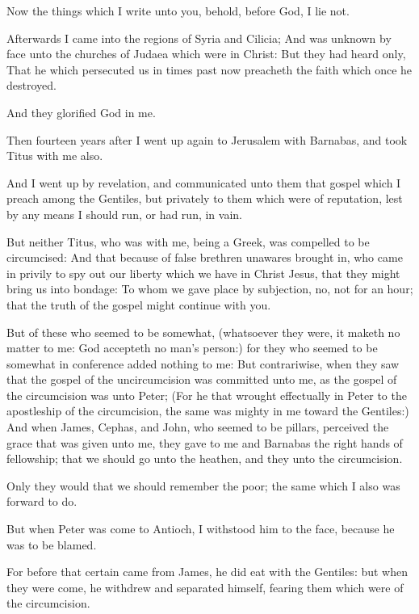 \Verse Now the things which I write unto you, behold, before God, I lie not.

\Verse Afterwards I came into the regions of Syria and Cilicia; \Verse And was unknown by face unto the churches of Judaea which were in Christ: \Verse But they had heard only, That he which persecuted us in times past now preacheth the faith which once he destroyed.

\Verse And they glorified God in me.


\Chapter
\Verse Then fourteen years after I went up again to Jerusalem with Barnabas, and took Titus with me also.

\Verse And I went up by revelation, and communicated unto them that gospel which I preach among the Gentiles, but privately to them which were of reputation, lest by any means I should run, or had run, in vain.

\Verse But neither Titus, who was with me, being a Greek, was compelled to be circumcised: \Verse And that because of false brethren unawares brought in, who came in privily to spy out our liberty which we have in Christ Jesus, that they might bring us into bondage: \Verse To whom we gave place by subjection, no, not for an hour; that the truth of the gospel might continue with you.

\Verse But of these who seemed to be somewhat, (whatsoever they were, it maketh no matter to me: God accepteth no man's person:) for they who seemed to be somewhat in conference added nothing to me: \Verse But contrariwise, when they saw that the gospel of the uncircumcision was committed unto me, as the gospel of the circumcision was unto Peter; \Verse (For he that wrought effectually in Peter to the apostleship of the circumcision, the same was mighty in me toward the Gentiles:) \Verse And when James, Cephas, and John, who seemed to be pillars, perceived the grace that was given unto me, they gave to me and Barnabas the right hands of fellowship; that we should go unto the heathen, and they unto the circumcision.

\Verse Only they would that we should remember the poor; the same which I also was forward to do.

\Verse But when Peter was come to Antioch, I withstood him to the face, because he was to be blamed.

\Verse For before that certain came from James, he did eat with the Gentiles: but when they were come, he withdrew and separated himself, fearing them which were of the circumcision.

